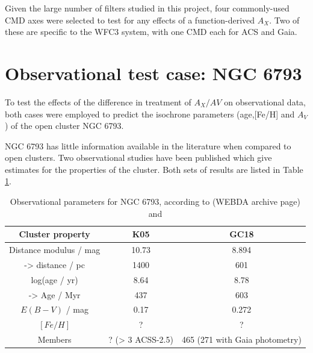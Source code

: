 \documentclass[12pt, a4paper]{report}
\begin{document}
Given the large number of filters studied in this project, four commonly-used CMD axes were selected to test for any effects of a function-derived $A_{X}$. Two of these are specific to the WFC3 system, with one CMD each for ACS and Gaia.

\section{Observational test case: NGC 6793}
To test the effects of the difference in treatment of $A_{X}/A{V}$ on observational data, both cases were employed to predict the isochrone parameters (age,[Fe/H] and $A_{V}$) of the open cluster NGC 6793.

NGC 6793 has little information available in the literature when compared to open clusters. Two observational studies have been published which give estimates for the properties of the cluster. Both sets of results are listed in Table \ref{NGC6793_obs}.

\begin{table}
\begin{center}
\begin{tabular}{ccc}
\hline
Cluster property & K05 & GC18 \\
\hline
Distance modulus / mag & 10.73 & 8.894 \\
-> distance / pc & 1400 & 601 \\
log(age / yr) & 8.64 & 8.78 \\
-> Age / Myr & 437 & 603 \\
$E(B-V)$ / mag & 0.17 & 0.272 \\
$[Fe/H]$ & ? & ? \\
Members & ? (> 3 ACSS-2.5) & 465 (271 with Gaia photometry) \\
\hline
\end{tabular}
\caption{Observational parameters for NGC 6793, according to \cite{2005A&A...438.1163K} (WEBDA archive page) and \cite{2018A&A...616A..10G}}
\label{NGC6793_obs}
\end{center}
\end{table}
\end{document}
